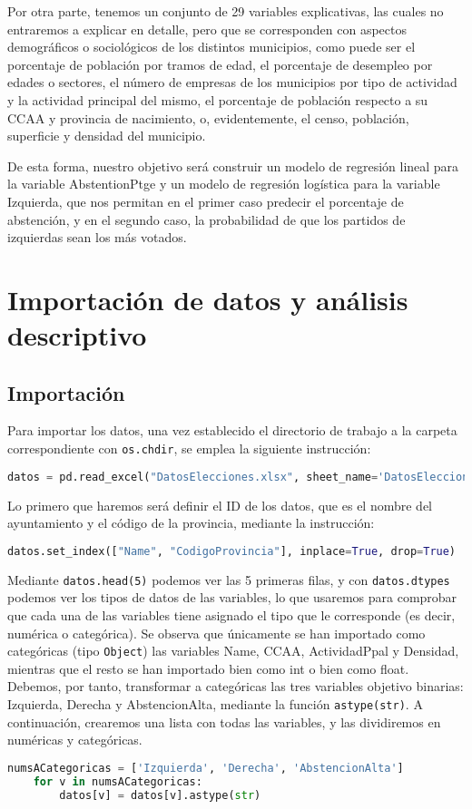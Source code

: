 \documentclass[a4paper,onecolumn]{extarticle}
\let\stdsection\section
\renewcommand\section{\newpage\stdsection}
\begin{document}
\begin{sloppypar}
Por otra parte, tenemos un conjunto de 29 variables explicativas, las cuales no entraremos a explicar en detalle, pero que se corresponden con aspectos 
demográficos o sociológicos de los distintos municipios, como puede ser el porcentaje de población por tramos de edad, el porcentaje de desempleo por edades 
o sectores, el número de empresas de los municipios por tipo de actividad y la actividad principal del mismo, el porcentaje de población respecto a su CCAA 
y provincia de nacimiento, o, evidentemente, el censo, población, superficie y densidad del municipio.

De esta forma, nuestro objetivo será construir un modelo de regresión lineal para la variable AbstentionPtge y un modelo de regresión logística para la 
variable Izquierda, que nos permitan en el primer caso predecir el porcentaje de abstención, y en el segundo caso, la probabilidad de que los partidos de 
izquierdas sean los más votados.

\section{Importación de datos y análisis descriptivo}\label{importacionAnalisis}
\subsection{Importación}\label{importacion}
Para importar los datos, una vez establecido el directorio de trabajo a la carpeta correspondiente con \texttt{os.chdir}, se emplea la siguiente instrucción:
\begin{lstlisting}[language=Python, numbers=none]
    datos = pd.read_excel("DatosElecciones.xlsx", sheet_name='DatosEleccionesEspaña')
\end{lstlisting}

Lo primero que haremos será definir el ID de los datos, que es el nombre del ayuntamiento y el código de la provincia, mediante la instrucción:
\begin{lstlisting}[language=Python,numbers=none]
datos.set_index(["Name", "CodigoProvincia"], inplace=True, drop=True)
\end{lstlisting}

Mediante \texttt{datos.head(5)} podemos ver las 5 primeras filas, y con \texttt{datos.dtypes} podemos ver los tipos de datos de las variables, lo que 
usaremos para comprobar que cada una de las variables tiene asignado el tipo que le corresponde (es decir, numérica o categórica). Se observa que únicamente
se han importado como categóricas (tipo \texttt{Object}) las variables Name, CCAA, ActividadPpal y Densidad, mientras que el resto se han importado bien 
como int o bien como float. Debemos, por tanto, transformar a categóricas las tres variables objetivo binarias: Izquierda, Derecha y AbstencionAlta, mediante 
la función \texttt{astype(str)}. A continuación, crearemos una lista con todas las variables, y las dividiremos en numéricas y categóricas.
\begin{lstlisting}[language=Python]
    numsACategoricas = ['Izquierda', 'Derecha', 'AbstencionAlta']
    for v in numsACategoricas:
        datos[v] = datos[v].astype(str)


\end{lstlisting}
\end{sloppypar}
\end{document}
